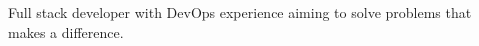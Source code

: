 
\begin{cvparagraph}
Full stack developer with DevOps experience aiming to solve problems that makes a difference.
\end{cvparagraph}
